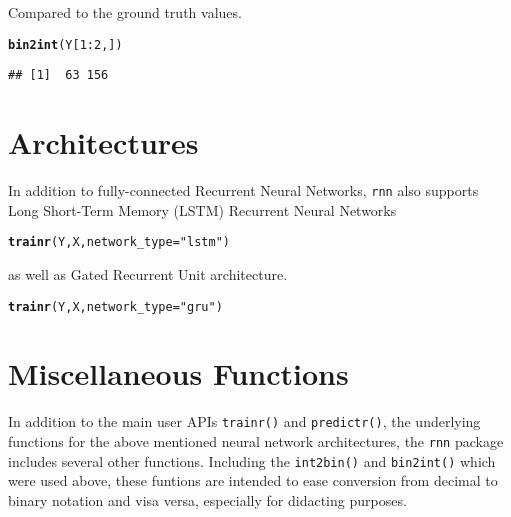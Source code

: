 \documentclass[english,article]{article}\usepackage[]{graphicx}\usepackage[]{color}
\makeatletter
\newcommand{\hlnum}[1]{\textcolor[rgb]{0.686,0.059,0.569}{#1}}%
\newcommand{\hlstr}[1]{\textcolor[rgb]{0.192,0.494,0.8}{#1}}%
\newcommand{\hlopt}[1]{\textcolor[rgb]{0,0,0}{#1}}%
\newcommand{\hlstd}[1]{\textcolor[rgb]{0.345,0.345,0.345}{#1}}%
\newcommand{\hlkwc}[1]{\textcolor[rgb]{0.333,0.667,0.333}{#1}}%
\newcommand{\hlkwd}[1]{\textcolor[rgb]{0.737,0.353,0.396}{\textbf{#1}}}%
\newenvironment{kframe}{%
 \def\at@end@of@kframe{}%
 \ifinner\ifhmode%
  \def\at@end@of@kframe{\end{minipage}}%
  \begin{minipage}{\columnwidth}%
 \fi\fi%
 \def\FrameCommand##1{\hskip\@totalleftmargin \hskip-\fboxsep
 \colorbox{shadecolor}{##1}\hskip-\fboxsep
     \hskip-\linewidth \hskip-\@totalleftmargin \hskip\columnwidth}%
 \MakeFramed {\advance\hsize-\width
   \@totalleftmargin\z@ \linewidth\hsize
   \@setminipage}}%
 {\par\unskip\endMakeFramed%
 \at@end@of@kframe}
\newenvironment{knitrout}{}{} %
\providecommand*{\code}[1]{\texttt{#1}}
\makeatother
\begin{document}
Compared to the ground truth values.

\begin{knitrout}
\color{fgcolor}\begin{kframe}
\begin{alltt}
\hlkwd{bin2int}\hlstd{( Y[}\hlnum{1}\hlopt{:}\hlnum{2}\hlstd{,] )}
\end{alltt}
\begin{verbatim}
## [1]  63 156
\end{verbatim}
\end{kframe}
\end{knitrout}


\section{Architectures}

In addition to fully-connected Recurrent Neural Networks, \code{rnn}
also supports Long Short-Term Memory (LSTM) Recurrent Neural Networks
\citep{hochreiter1997long} 

\begin{knitrout}
\color{fgcolor}\begin{kframe}
\begin{alltt}
\hlkwd{trainr}\hlstd{(Y, X,} \hlkwc{network_type}\hlstd{=}\hlstr{"lstm"}\hlstd{)}
\end{alltt}
\end{kframe}
\end{knitrout}

as well as Gated Recurrent Unit \citep{cho2014learning} architecture.

\begin{knitrout}
\color{fgcolor}\begin{kframe}
\begin{alltt}
\hlkwd{trainr}\hlstd{(Y, X,} \hlkwc{network_type}\hlstd{=}\hlstr{"gru"}\hlstd{)}
\end{alltt}
\end{kframe}
\end{knitrout}


\section{Miscellaneous Functions}

In addition to the main user APIs \code{trainr()} and \code{predictr()},
the underlying functions for the above mentioned neural network architectures,
the \code{rnn} package includes several other functions. Including
the \code{int2bin()} and \code{bin2int()} which were used above,
these funtions are intended to ease conversion from decimal to binary
notation and visa versa, especially for didacting purposes.
\end{document}
